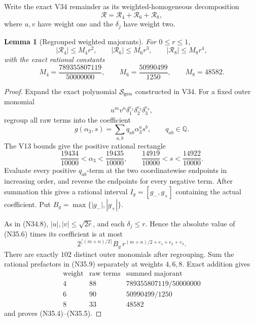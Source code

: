 \documentclass[11pt]{article}
\newtheorem{lemma}[theorem]{Lemma}
\theoremstyle{definition}
\theoremstyle{remark}
\begin{document}
Write the exact V34 remainder as its weighted-homogeneous decomposition
\[
 \mathcal R=\mathcal R_4+\mathcal R_6+\mathcal R_8,
\tag{N35.3}
\]
where \(u,v\) have weight one and the \(\delta_j\) have weight two.

\begin{lemma}[Regrouped weighted majorants]
\label{lem:f2v35-regrouped-majorants}
For \(0\leq r\leq1\),
\[
 |\mathcal R_4|\leq M_4r^2,\qquad
 |\mathcal R_6|\leq M_6r^3,\qquad
 |\mathcal R_8|\leq M_8r^4,
\tag{N35.4}
\]
with the exact rational constants
\[
 \boxed{
 M_4=\frac{789355807119}{50000000},\qquad
 M_6=\frac{50990499}{1250},\qquad
 M_8=48582.}
\tag{N35.5}
\]
\end{lemma}

\begin{proof}
Expand the exact polynomial \(\mathcal S_{\rm gen}\) constructed in V34.
For a fixed outer monomial
\[
 u^mv^n\delta_1^{e_1}\delta_2^{e_2}\delta_3^{e_3},
\tag{N35.6}
\]
regroup all raw terms into the coefficient
\[
 g(\alpha_3,s)=\sum_{a,b}q_{ab}\alpha_3^as^b,
 \qquad q_{ab}\in\mathbb Q.
\tag{N35.7}
\]
The V13 bounds give the positive rational rectangle
\[
 \frac{19434}{10000}<\alpha_3<\frac{19435}{10000},
 \qquad
 \frac{14919}{10000}<s<\frac{14922}{10000}.
\tag{N35.8}
\]
Evaluate every positive \(q_{ab}\)-term at the two coordinatewise
endpoints in increasing order, and reverse the endpoints for every negative
term.  After summation this gives a rational interval
\(I_g=[g_-,g_+]\) containing the actual coefficient.  Put
\(B_g=\max\{|g_-|,|g_+|\}\).

As in \textup{(N34.8)},
\(|u|,|v|\leq\sqrt{2r}\), and each \(\delta_j\leq r\).  Hence the
absolute value of \textup{(N35.6)} times its coefficient is at most
\[
 2^{\lceil(m+n)/2\rceil}B_g\,
 r^{(m+n)/2+e_1+e_2+e_3}.
\tag{N35.9}
\]
There are exactly \(102\) distinct outer monomials after regrouping.  Sum
the rational prefactors in \textup{(N35.9)} separately at weights
\(4,6,8\).  Exact addition gives
\[
\begin{array}{c|c|c}
\text{weight}&\text{raw terms}&\text{summed majorant}\\ \hline
4&88&789355807119/50000000\\
6&90&50990499/1250\\
8&33&48582
\end{array}
\tag{N35.10}
\]
and proves \textup{(N35.4)}--\textup{(N35.5)}.
\end{proof}
\end{document}
